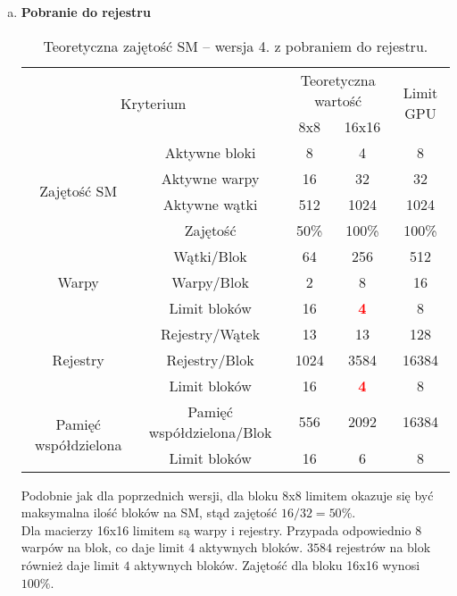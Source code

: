 \begin{enumerate}[(a)]

\item \textbf{Pobranie do rejestru} \newline

\begin{center}
\begin{table}[H]
\centering
\begin{tabular}{|c|c|c|c|c|}
\hline
\multicolumn{2}{|c|}{\multirow{2}{*}{Kryterium}} & \multicolumn{2}{c|}{Teoretyczna wartość} & \multirow{2}{*}{Limit GPU} \\ \cline{3-4}
\multicolumn{2}{|c|}{} & 8x8 & 16x16 & \\ \hline
\multirow{4}{*}{Zajętość SM} & Aktywne bloki & 8 & 4 & 8 \\ \cline{2-5}
& Aktywne warpy & 16 & 32 & 32 \\ \cline{2-5}
& Aktywne wątki & 512 & 1024 & 1024 \\ \cline{2-5}
& Zajętość & 50\% & 100\% & 100\% \\ \hline
\multirow{3}{*}{Warpy} & Wątki/Blok & 64 & 256 & 512 \\ \cline{2-5}
& Warpy/Blok & 2 & 8 & 16 \\ \cline{2-5}
& Limit bloków & 16 & \textcolor{red}{\textbf{4}} & 8 \\ \hline
\multirow{3}{*}{Rejestry} & Rejestry/Wątek & 13 & 13 & 128 \\ \cline{2-5}
& Rejestry/Blok & 1024 & 3584 & 16384 \\ \cline{2-5}
& Limit bloków & 16 & \textcolor{red}{\textbf{4}} & 8 \\ \hline
\multirow{2}{*}{Pamięć współdzielona} & Pamięć współdzielona/Blok & 556 & 2092 & 16384 \\ \cline{2-5}
& Limit bloków & 16 & 6 & 8 \\ \hline
\end{tabular}
\caption{Teoretyczna zajętość SM -- wersja 4. z pobraniem do rejestru.}
\end{table}
\end{center}

Podobnie jak dla poprzednich wersji, dla bloku 8x8 limitem okazuje się być maksymalna ilość bloków na SM, stąd zajętość $ 16 / 32 = 50\% $. \\
Dla macierzy 16x16 limitem są warpy i rejestry. Przypada odpowiednio $ 8 $ warpów na blok, co daje limit $ 4 $ aktywnych bloków. $ 3584 $ rejestrów na blok również daje limit $ 4 $ aktywnych bloków. Zajętość dla bloku 16x16 wynosi $ 100\% $. \\


\end{enumerate}
